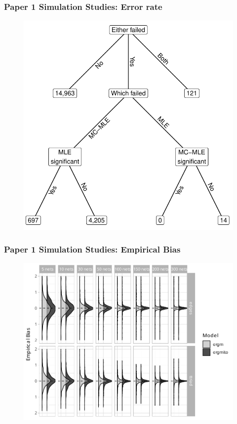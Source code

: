 \documentclass[aspectratio=169, 10pt]{beamer}
\begin{document}
\begin{frame}
\frametitle{Paper 1 Simulation Studies: Error rate}

\begin{figure}
\centering
\includegraphics[width=.5\linewidth]{failed-tree.pdf}
\end{figure}

\end{frame}

\begin{frame}
\frametitle{Paper 1 Simulation Studies: Empirical Bias}

\begin{figure}
\centering
\includegraphics[width=.7\linewidth]{bias-02-various-sizes-4-5-ttriad.pdf}
\end{figure}

\end{frame}
\end{document}
